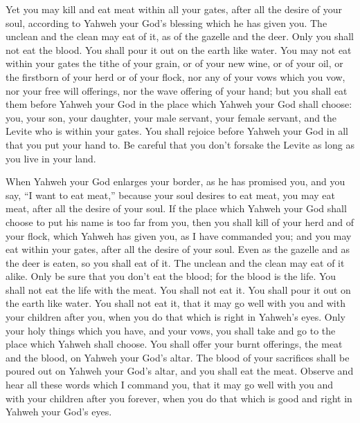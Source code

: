  Yet you may kill and eat meat within all your gates,
after all the desire of your soul, according to Yahweh your God's
blessing which he has given you. The unclean and the clean may eat of
it, as of the gazelle and the deer.  Only you shall not
eat the blood. You shall pour it out on the earth like water.
 You may not eat within your gates the tithe of your
grain, or of your new wine, or of your oil, or the firstborn of your
herd or of your flock, nor any of your vows which you vow, nor your free
will offerings, nor the wave offering of your hand;  but
you shall eat them before Yahweh your God in the place which Yahweh your
God shall choose: you, your son, your daughter, your male servant, your
female servant, and the Levite who is within your gates. You shall
rejoice before Yahweh your God in all that you put your hand to.
 Be careful that you don't forsake the Levite as long as
you live in your land.

 When Yahweh your God enlarges your border, as he has
promised you, and you say, ``I want to eat meat,'' because your soul
desires to eat meat, you may eat meat, after all the desire of your
soul.  If the place which Yahweh your God shall choose to
put his name is too far from you, then you shall kill of your herd and
of your flock, which Yahweh has given you, as I have commanded you; and
you may eat within your gates, after all the desire of your soul.
 Even as the gazelle and as the deer is eaten, so you
shall eat of it. The unclean and the clean may eat of it alike.
 Only be sure that you don't eat the blood; for the blood
is the life. You shall not eat the life with the meat. 
You shall not eat it. You shall pour it out on the earth like water.
 You shall not eat it, that it may go well with you and
with your children after you, when you do that which is right in
Yahweh's eyes.  Only your holy things which you have, and
your vows, you shall take and go to the place which Yahweh shall choose.
 You shall offer your burnt offerings, the meat and the
blood, on Yahweh your God's altar. The blood of your sacrifices shall be
poured out on Yahweh your God's altar, and you shall eat the meat.
 Observe and hear all these words which I command you,
that it may go well with you and with your children after you forever,
when you do that which is good and right in Yahweh your God's eyes.

